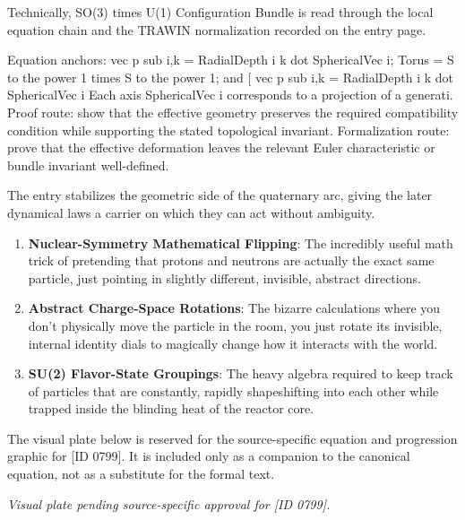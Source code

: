 Technically, SO(3) times U(1) Configuration Bundle is read through the local equation chain and the TRAWIN normalization recorded on the entry page.

Equation anchors: vec p sub i,k = RadialDepth i k dot SphericalVec i; Torus = S to the power 1 times S to the power 1; and [ vec p sub i,k = RadialDepth i k dot SphericalVec i Each axis SphericalVec i corresponds to a projection of a generati. Proof route: show that the effective geometry preserves the required compatibility condition while supporting the stated topological invariant. Formalization route: prove that the effective deformation leaves the relevant Euler characteristic or bundle invariant well-defined.

The entry stabilizes the geometric side of the quaternary arc, giving the later dynamical laws a carrier on which they can act without ambiguity.
\endgroup

\begin{enumerate}[leftmargin=1.6em,itemsep=6pt,topsep=4pt]
\item \textbf{Nuclear-Symmetry Mathematical Flipping}: The incredibly useful math trick of pretending that protons and neutrons are actually the exact same particle, just pointing in slightly different, invisible, abstract directions.
\item \textbf{Abstract Charge-Space Rotations}: The bizarre calculations where you don't physically move the particle in the room, you just rotate its invisible, internal identity dials to magically change how it interacts with the world.
\item \textbf{SU(2) Flavor-State Groupings}: The heavy algebra required to keep track of particles that are constantly, rapidly shapeshifting into each other while trapped inside the blinding heat of the reactor core.
\end{enumerate}

\begingroup\footnotesize\sloppy
The visual plate below is reserved for the source-specific equation and progression graphic for [ID 0799]. It is included only as a companion to the canonical equation, not as a substitute for the formal text.
\par\endgroup
\begingroup\footnotesize\itshape
Visual plate pending source-specific approval for [ID 0799].
\par\endgroup


